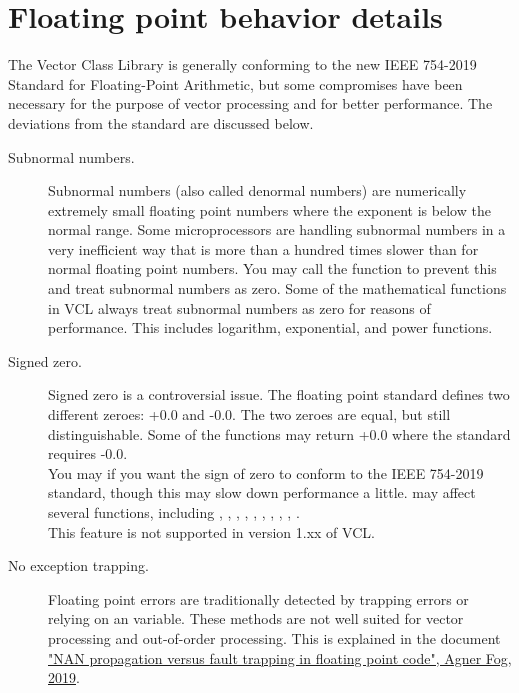\documentclass[vcl_manual.tex]{subfiles}
\begin{document}
\section{Floating point behavior details}
\label{FloatingPointBehavior}

The Vector Class Library is generally conforming to the new IEEE 754-2019 Standard for Floating-Point Arithmetic, but some compromises have been necessary for the purpose of vector processing and for better performance. The deviations from the standard are discussed below.

\begin{description}

\item[Subnormal numbers.]
Subnormal numbers (also called denormal numbers) are numerically extremely small floating point numbers where the exponent is below the normal range. Some microprocessors are handling subnormal numbers in a very inefficient way that is more than a hundred times slower than for normal floating point numbers. You may call the function  to prevent this and treat subnormal numbers as zero. Some of the mathematical functions in VCL always treat subnormal numbers as zero for reasons of performance. This includes logarithm, exponential, and power functions.

\item[Signed zero.]
Signed zero is a controversial issue. The floating point standard defines two different zeroes: +0.0 and -0.0.
The two zeroes are equal, but still distinguishable. Some of the functions may return +0.0 where the standard requires -0.0.\\
You may {}  {} if you want the sign of zero to conform to the
IEEE 754-2019 standard, though this may slow down performance a little.
 may affect several functions, including
, , , , 
, , , , , . \\
This feature is not supported in version 1.xx of VCL.

\item[No exception trapping.] \label{NoExceptionTrapping}
Floating point errors are traditionally detected by trapping errors or relying on an  variable. These methods are not well suited for vector processing and out-of-order processing. This is explained in the document \href{https://www.agner.org/optimize/nan_propagation.pdf}{"NAN propagation versus fault trapping in floating point code", Agner Fog, 2019}.


\end{description}
\end{document}
